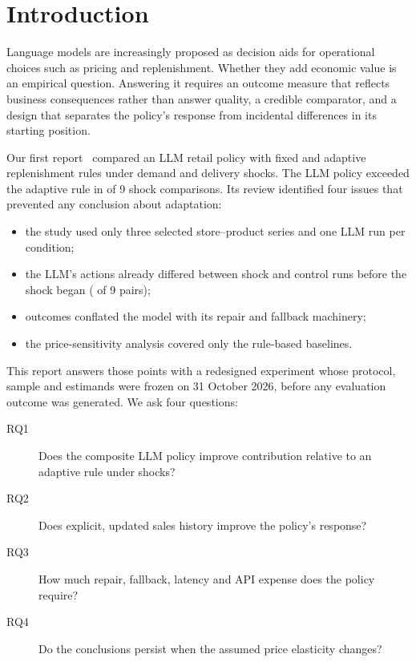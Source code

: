 \documentclass[runningheads]{llncs}
\begin{document}
\section{Introduction}

Language models are increasingly proposed as decision aids for operational choices such as pricing and replenishment. Whether they add economic value is an empirical question. Answering it requires an outcome measure that reflects business consequences rather than answer quality, a credible comparator, and a design that separates the policy's response from incidental differences in its starting position.

Our first report~\cite{report1} compared an LLM retail policy with fixed and adaptive replenishment rules under demand and delivery shocks. The LLM policy exceeded the adaptive rule in  of 9 shock comparisons. Its review identified four issues that prevented any conclusion about adaptation:
\begin{itemize}
\item the study used only three selected store--product series and one LLM run per condition;
\item the LLM's actions already differed between shock and control runs before the shock began ( of 9 pairs);
\item outcomes conflated the model with its repair and fallback machinery;
\item the price-sensitivity analysis covered only the rule-based baselines.
\end{itemize}

This report answers those points with a redesigned experiment whose protocol, sample and estimands were frozen on 31 October 2026, before any evaluation outcome was generated. We ask four questions:
\begin{description}
\item[RQ1] Does the composite LLM policy improve contribution relative to an adaptive rule under shocks?
\item[RQ2] Does explicit, updated sales history improve the policy's response?
\item[RQ3] How much repair, fallback, latency and API expense does the policy require?
\item[RQ4] Do the conclusions persist when the assumed price elasticity changes?
\end{description}
\end{document}
